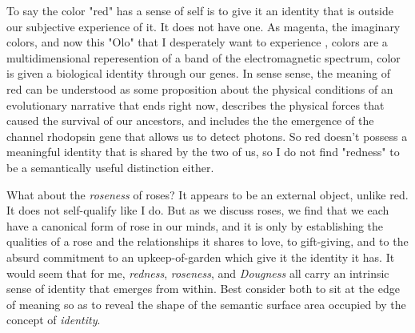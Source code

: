 \documentclass[runningheads]{llncs}
\begin{document}
To say the color "red" has a sense of self is to give it an identity that is outside our subjective experience of it. It does not have one. As magenta, the imaginary colors, and now this "Olo" that I desperately want to experience \cite{Gibney2025}, colors are a multidimensional reperesention of a band of the electromagnetic spectrum, color is given a biological identity through our genes. In sense sense, the meaning of red can be understood as some proposition about the physical conditions of an evolutionary narrative that ends right now, describes the physical forces that caused the survival of our ancestors, and includes the the emergence of the channel rhodopsin gene that allows us to detect photons. So red doesn't possess a meaningful identity that is shared by the two of us, so I do not find "redness" to be a semantically useful distinction either.  

What about the \emph{roseness} of roses? It appears to be an external object, unlike red. It does not self-qualify like I do. But as we discuss roses, we find that we each have a canonical form of rose in our minds, and it is only by establishing the qualities of a rose and the relationships it shares to love, to gift-giving, and to the absurd commitment to an upkeep-of-garden which give it the identity it has. It would seem that for me, \emph{redness}, \emph{roseness}, and \emph{Dougness} all carry an intrinsic sense of identity that emerges from within. Best consider both to sit at the edge of meaning so as to reveal the shape of the semantic surface area occupied by the concept of \emph{identity}.
\end{document}
